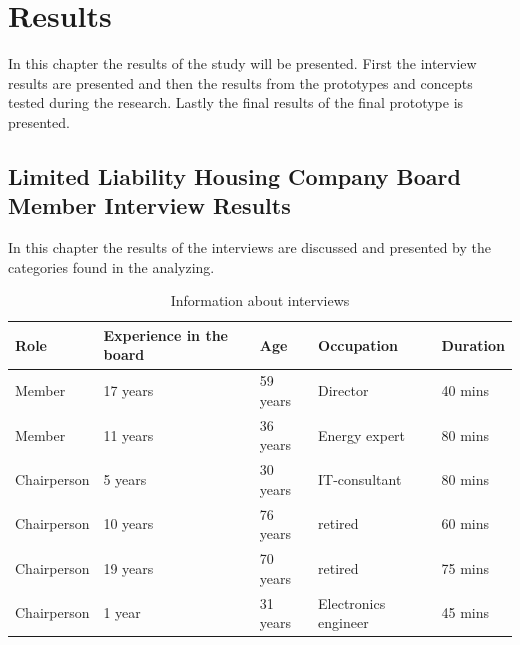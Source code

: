 \chapter{Results}
\label{chapter:results}

In this chapter the results of the study will be presented. First the interview results are presented and then the results from the prototypes and concepts tested during the research. Lastly the final results of the final prototype is presented. 

\section{Limited Liability Housing Company Board Member Interview Results}
\label{section:interviews}
In this chapter the results of the interviews are discussed and presented by the categories found in the analyzing.

\begin{table}
\begin{tabular}{|p{2.3cm}|p{2.8cm}|p{1.8cm}|p{2.7cm}|p{1.9cm}|} 
\hline %
\textbf{Role} & \raggedright\textbf{Experience in the board} & \textbf{Age} & \textbf{Occupation} & \textbf{Duration} \\ 
\hline 
Member & 17 years & 59 years & Director & 40 mins \\ 
\hline
Member & 11 years & 36 years & Energy expert & 80 mins \\  
\hline
Chairperson & 5 years & 30 years & IT-consultant & 80 mins \\
\hline
Chairperson & 10 years & 76 years & retired & 60 mins \\
\hline
Chairperson & 19 years & 70 years & retired & 75 mins \\
\hline
Chairperson & 1 year & 31 years & Electronics engineer & 45 mins \\
\hline
\end{tabular} %
\caption{Information about interviews}
\label{table:interviewtb}
\end{table} %

